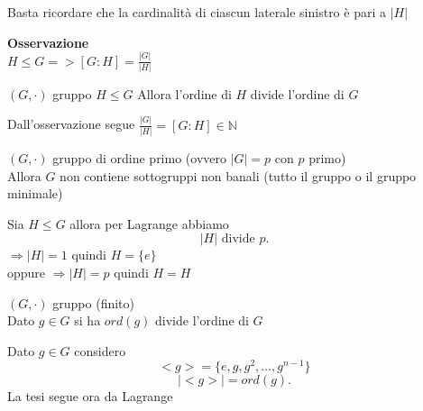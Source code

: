 \documentclass[12px]{article}
\begin{document}
	\begin{dimo}
		Basta ricordare che la cardinalità di ciascun laterale sinistro è pari a $|H|$
	\end{dimo}
	\textbf{Osservazione}\\
	$\displaystyle H\leq G => [G:H] = \frac {|G|}{|H|}$\\
	\begin{teo}[Lagrange]
		$(G,\cdot)$ gruppo $H\leq G$ Allora l'ordine di  $H$ divide l'ordine di  $G$
	\end{teo}
	\begin{dimo}
		Dall'osservazione segue $\displaystyle\frac{|G|}{|H|} = [G:H]\in \mathbb N$
	\end{dimo}
	\begin{coro}
		$(G,\cdot)$ gruppo di ordine primo (ovvero $|G| = p$ con $p$ primo)\\
		Allora $G$ non contiene sottogruppi non banali (tutto il gruppo o il gruppo minimale)
	\end{coro}
	\begin{dimo}
		Sia $H\leq G$ allora per Lagrange abbiamo
		 \[
			 |H| \text{ divide } p
		.\] 
		$ \Rightarrow |H| = 1$ quindi  $H = \lbrace e \rbrace$\\
		oppure 
		$ \Rightarrow |H| = p$ quindi $H=H$

	\end{dimo}
	\begin{coro}
		$(G,\cdot)$ gruppo (finito)\\
		Dato $g\in G $ si ha  $ord(g)$ divide l'ordine di $G$
		
	\end{coro}
	\begin{dimo}
		Dato $g\in G$ considero\\
		\[
			<g> = \lbrace e, g, g^2, \ldots, g^{n-1}\rbrace
		\]
		\[
		|<g>| = ord(g)
		.\] 
		La tesi segue ora da Lagrange
	\end{dimo}
\end{document}
